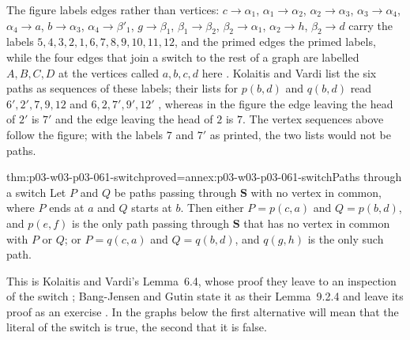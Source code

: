 The figure labels edges rather than vertices: \(c\to\alpha_1\),
\(\alpha_1\to\alpha_2\), \(\alpha_2\to\alpha_3\), \(\alpha_3\to\alpha_4\),
\(\alpha_4\to a\), \(b\to\alpha_3\), \(\alpha_4\to\beta'_1\),
\(g\to\beta_1\), \(\beta_1\to\beta_2\), \(\beta_2\to\alpha_1\),
\(\alpha_2\to h\), \(\beta_2\to d\) carry the labels \(5,4,3,2,1,6,7,8,9,
10,11,12\), and the primed edges the primed labels, while the four edges that
join a switch to the rest of a graph are labelled \(A,B,C,D\) at the
vertices called \(a,b,c,d\) here
\cite[Fig.~9.1, p.~479]{BangJensenGutin2007DigraphsCorrected}. Kolaitis and
Vardi list the six paths as sequences of these labels; their lists for
\(p(b,d)\) and \(q(b,d)\) read \(6',2',7,9,12\) and \(6,2,7',9',12'\)
\cite[p.~30]{KolaitisVardi1995DatalogManuscript}, whereas in the figure the
edge leaving the head of \(2'\) is \(7'\) and the edge leaving the head of
\(2\) is \(7\). The vertex sequences above follow the figure; with the labels
\(7\) and \(7'\) as printed, the two lists would not be paths.

\begin{hblemma}{thm:p03-w03-p03-061-switch}{proved=annex:p03-w03-p03-061-switch}{Paths through a switch}
Let \(P\) and \(Q\) be paths passing through \(\mathbf S\) with no vertex in
common, where \(P\) ends at \(a\) and \(Q\) starts at \(b\). Then either
\(P=p(c,a)\) and \(Q=p(b,d)\), and \(p(e,f)\) is the only path passing
through \(\mathbf S\) that has no vertex in common with \(P\) or \(Q\); or
\(P=q(c,a)\) and \(Q=q(b,d)\), and \(q(g,h)\) is the only such path.
\end{hblemma}

This is Kolaitis and Vardi's Lemma~6.4, whose proof they leave to an
inspection of the switch \cite[Lemma~6.4, p.~30]{KolaitisVardi1995DatalogManuscript};
Bang-Jensen and Gutin state it as their Lemma~9.2.4 and leave its proof as an
exercise \cite[Lemma~9.2.4, p.~478]{BangJensenGutin2007DigraphsCorrected}.
In the graphs below the first alternative will mean that the literal of the
switch is true, the second that it is false.

